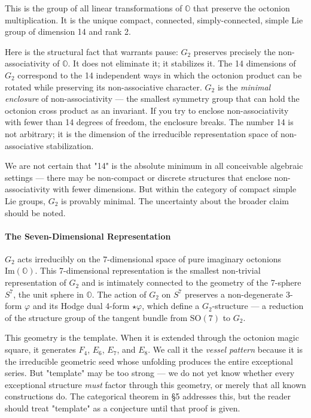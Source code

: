 \documentclass[12pt,a4paper]{article}
\newcommand{\pilcrow}{\S}
\begin{document}
This is the group of all linear transformations of $\mathbb{O}$ that preserve the octonion multiplication. It is the unique compact, connected, simply-connected, simple Lie group of dimension 14 and rank 2.

Here is the structural fact that warrants pause: $G_2$ preserves precisely the non-associativity of $\mathbb{O}$. It does not eliminate it; it stabilizes it. The 14 dimensions of $G_2$ correspond to the 14 independent ways in which the octonion product can be rotated while preserving its non-associative character. $G_2$ is the \emph{minimal enclosure} of non-associativity --- the smallest symmetry group that can hold the octonion cross product as an invariant. If you try to enclose non-associativity with fewer than 14 degrees of freedom, the enclosure breaks. The number 14 is not arbitrary; it is the dimension of the irreducible representation space of non-associative stabilization.

We are not certain that "14" is the absolute minimum in all conceivable algebraic settings --- there may be non-compact or discrete structures that enclose non-associativity with fewer dimensions. But within the category of compact simple Lie groups, $G_2$ is provably minimal. The uncertainty about the broader claim should be noted.

\paragraph{The Seven-Dimensional Representation}

$G_2$ acts irreducibly on the 7-dimensional space of pure imaginary octonions $\text{Im}(\mathbb{O})$. This 7-dimensional representation is the smallest non-trivial representation of $G_2$ and is intimately connected to the geometry of the 7-sphere $S^7$, the unit sphere in $\mathbb{O}$. The action of $G_2$ on $S^7$ preserves a non-degenerate 3-form $\varphi$ and its Hodge dual 4-form $\star\varphi$, which define a $G_2$-structure --- a reduction of the structure group of the tangent bundle from $\text{SO}(7)$ to $G_2$.

This geometry is the template. When it is extended through the octonion magic square, it generates $F_4$, $E_6$, $E_7$, and $E_8$. We call it the \emph{vessel pattern} because it is the irreducible geometric seed whose unfolding produces the entire exceptional series. But "template" may be too strong --- we do not yet know whether every exceptional structure \emph{must} factor through this geometry, or merely that all known constructions do. The categorical theorem in \pilcrow{}5 addresses this, but the reader should treat "template" as a conjecture until that proof is given.
\end{document}
